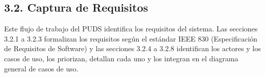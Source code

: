 \subsection{3.2. Captura de Requisitos}\label{sec:v2_captura_requisitos}

Este flujo de trabajo del PUDS identifica los requisitos del sistema. Las secciones 3.2.1 a 3.2.3 formalizan los requisitos según el estándar IEEE 830 (Especificación de Requisitos de Software) y las secciones 3.2.4 a 3.2.8 identifican los actores y los casos de uso, los priorizan, detallan cada uno y los integran en el diagrama general de casos de uso.









